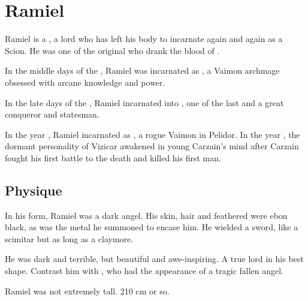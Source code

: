 \section{Ramiel}
Ramiel is a \Malach, a \resphan{} lord who has left his \resphan{} body to incarnate again and again as a \human{} Scion. 
He was one of the original \satharioth{} who drank the blood of \Nexagglachel. 


In the middle days of the \VaimonCaliphate, Ramiel was incarnated as , a Vaimon archmage obsessed with arcane knowledge and power. 

In the late days of the \caliphate, Ramiel incarnated into , one of the last \VaimonCaliphs and a great conqueror and statesman. 

In the year , Ramiel incarnated as \CarzainDeracilleShireyo, a rogue Vaimon in Pelidor. In the year , the dormant personality of Vizicar awakened in young Carzain's mind after Carzain fought his first battle to the death and killed his first man. 









\subsection{Physique}
In his \resphan{} form, Ramiel was a dark angel. 
His skin, hair and feathered were ebon black, as was the metal \armour he summoned to encase him. 
He wielded a sword, like a scimitar but as long as a claymore. 

He was dark and terrible, but beautiful and awe-inspiring. 
A true \sathariah{} lord in his best shape. 
Contrast him with , who had the appearance of a tragic fallen angel.

Ramiel was not extremely tall. 210 cm or so. 









